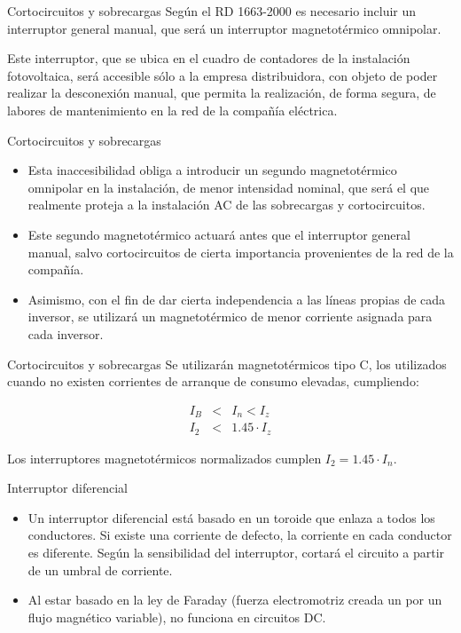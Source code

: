 \documentclass[xcolor={usenames,svgnames,dvipsnames}]{beamer}
\begin{document}
\begin{frame}[label=sec-5-2-2]{Cortocircuitos y sobrecargas}
Según el RD 1663-2000 es necesario incluir un \alert{interruptor general manual}, que será un interruptor magnetotérmico omnipolar.

Este interruptor, que se ubica en el cuadro de contadores de la instalación fotovoltaica, será \alert{accesible sólo a la empresa distribuidora}, con objeto de poder realizar la desconexión manual, que permita la realización, de forma segura, de labores de mantenimiento en la red de la compañía eléctrica.
\end{frame}

\begin{frame}[label=sec-5-2-3]{Cortocircuitos y sobrecargas}
\begin{itemize}
\item Esta inaccesibilidad obliga a introducir un \alert{segundo magnetotérmico omnipolar} en la instalación, de menor intensidad nominal, que será el que realmente proteja a la instalación AC de las sobrecargas y cortocircuitos.

\item Este segundo magnetotérmico actuará antes que el interruptor general manual, salvo cortocircuitos de cierta importancia provenientes de la red de la compañía.

\item Asimismo, con el fin de dar cierta independencia a las líneas propias de cada inversor, se utilizará un magnetotérmico de menor corriente asignada para cada inversor.
\end{itemize}
\end{frame}

\begin{frame}[label=sec-5-2-4]{Cortocircuitos y sobrecargas}
Se utilizarán \alert{magnetotérmicos tipo C}, los utilizados cuando no existen corrientes de arranque de consumo elevadas, cumpliendo:

$$\begin{aligned}
I_{B} & < & I_{n}<I_{z}\\
I_{2} & < & 1.45\cdot I_{z}\end{aligned}$$

Los interruptores magnetotérmicos normalizados cumplen $I_{2}=1.45\cdot I_{n}$.
\end{frame}

\begin{frame}[label=sec-5-2-5]{Interruptor diferencial}
\begin{itemize}
\item Un interruptor diferencial está basado en un toroide que enlaza a todos los conductores. Si existe una corriente de defecto, la corriente en cada conductor es diferente. Según la sensibilidad del interruptor, cortará el circuito a partir de un umbral de corriente.

\item Al estar basado en la ley de Faraday (fuerza electromotriz creada un por un flujo magnético variable), \alert{no funciona en circuitos DC}.
\end{itemize}
\end{frame}
\end{document}
